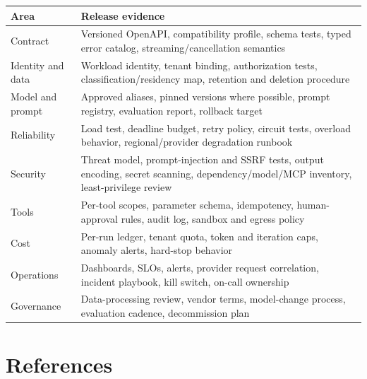 \documentclass[10pt]{article}
\begin{document}
\begin{tabularx}{\textwidth}{P{0.24\textwidth} Y}
\toprule
\textbf{Area} & \textbf{Release evidence} \\
\midrule
Contract & Versioned OpenAPI, compatibility profile, schema tests, typed error catalog, streaming/cancellation semantics \\
Identity and data & Workload identity, tenant binding, authorization tests, classification/residency map, retention and deletion procedure \\
Model and prompt & Approved aliases, pinned versions where possible, prompt registry, evaluation report, rollback target \\
Reliability & Load test, deadline budget, retry policy, circuit tests, overload behavior, regional/provider degradation runbook \\
Security & Threat model, prompt-injection and SSRF tests, output encoding, secret scanning, dependency/model/MCP inventory, least-privilege review \\
Tools & Per-tool scopes, parameter schema, idempotency, human-approval rules, audit log, sandbox and egress policy \\
Cost & Per-run ledger, tenant quota, token and iteration caps, anomaly alerts, hard-stop behavior \\
Operations & Dashboards, SLOs, alerts, provider request correlation, incident playbook, kill switch, on-call ownership \\
Governance & Data-processing review, vendor terms, model-change process, evaluation cadence, decommission plan \\
\bottomrule
\end{tabularx}

\section{References}
\end{document}
